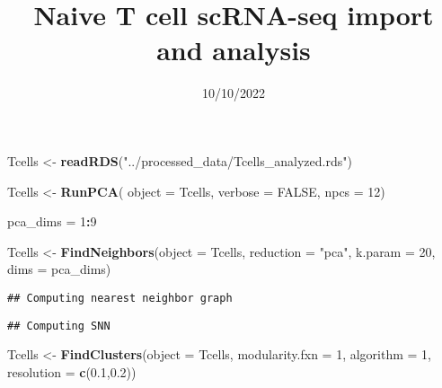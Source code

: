 \documentclass[
]{article}
\title{Naive T cell scRNA-seq import and analysis}
\author{}
\date{\vspace{-2.5em}10/10/2022}
\newenvironment{Shaded}{\begin{snugshade}}{\end{snugshade}}
\newcommand{\AttributeTok}[1]{\textcolor[rgb]{0.13,0.29,0.53}{#1}}
\newcommand{\ConstantTok}[1]{\textcolor[rgb]{0.56,0.35,0.01}{#1}}
\newcommand{\DecValTok}[1]{\textcolor[rgb]{0.00,0.00,0.81}{#1}}
\newcommand{\FloatTok}[1]{\textcolor[rgb]{0.00,0.00,0.81}{#1}}
\newcommand{\FunctionTok}[1]{\textcolor[rgb]{0.13,0.29,0.53}{\textbf{#1}}}
\newcommand{\NormalTok}[1]{#1}
\newcommand{\OtherTok}[1]{\textcolor[rgb]{0.56,0.35,0.01}{#1}}
\newcommand{\SpecialCharTok}[1]{\textcolor[rgb]{0.81,0.36,0.00}{\textbf{#1}}}
\newcommand{\StringTok}[1]{\textcolor[rgb]{0.31,0.60,0.02}{#1}}
\begin{document}
\maketitle

{
\setcounter{tocdepth}{2}
\tableofcontents
}
\begin{Shaded}
\begin{Highlighting}[]
\NormalTok{Tcells }\OtherTok{\textless{}{-}} \FunctionTok{readRDS}\NormalTok{(}\StringTok{"../processed\_data/Tcells\_analyzed.rds"}\NormalTok{)}
\end{Highlighting}
\end{Shaded}

\begin{Shaded}
\begin{Highlighting}[]
\NormalTok{Tcells }\OtherTok{\textless{}{-}} \FunctionTok{RunPCA}\NormalTok{(}
  \AttributeTok{object =}\NormalTok{ Tcells,}
  \AttributeTok{verbose =} \ConstantTok{FALSE}\NormalTok{,}
  \AttributeTok{npcs =} \DecValTok{12}\NormalTok{)}

\NormalTok{pca\_dims }\OtherTok{=} \DecValTok{1}\SpecialCharTok{:}\DecValTok{9}

\NormalTok{Tcells }\OtherTok{\textless{}{-}} \FunctionTok{FindNeighbors}\NormalTok{(}\AttributeTok{object =}\NormalTok{ Tcells,}
                        \AttributeTok{reduction =} \StringTok{"pca"}\NormalTok{,}
                        \AttributeTok{k.param =} \DecValTok{20}\NormalTok{,}
                        \AttributeTok{dims =}\NormalTok{ pca\_dims)}
\end{Highlighting}
\end{Shaded}

\begin{verbatim}
## Computing nearest neighbor graph
\end{verbatim}

\begin{verbatim}
## Computing SNN
\end{verbatim}

\begin{Shaded}
\begin{Highlighting}[]
\NormalTok{Tcells }\OtherTok{\textless{}{-}} \FunctionTok{FindClusters}\NormalTok{(}\AttributeTok{object =}\NormalTok{ Tcells,}
                       \AttributeTok{modularity.fxn =} \DecValTok{1}\NormalTok{,}
                       \AttributeTok{algorithm =} \DecValTok{1}\NormalTok{,}
                       \AttributeTok{resolution =} \FunctionTok{c}\NormalTok{(}\FloatTok{0.1}\NormalTok{,}\FloatTok{0.2}\NormalTok{))}
\end{Highlighting}
\end{Shaded}
\end{document}
